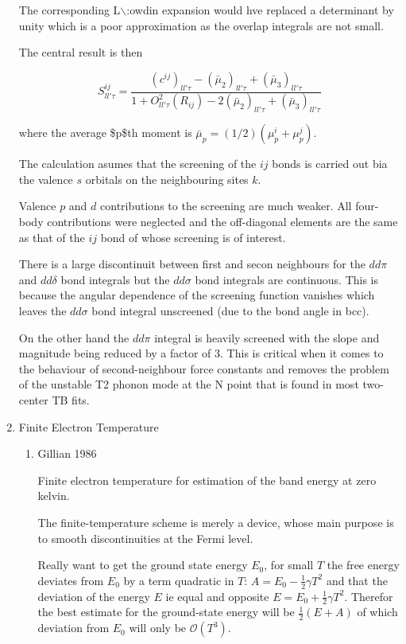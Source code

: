 \documentclass[11pt]{article}
\begin{document}
\begin{enumerate}
The corresponding L$\backslash$:owdin expansion would hve replaced a determinant by unity
which is a poor approximation as the overlap integrals are not small. 

The central result is then 

\begin{equation}
S^{ij}_{ll'\tau} = \frac{ (c^{ij})_{ll'\tau} - (\bar{\mu}_2)_{ll'\tau} +
         (\bar{\mu}_{3})_{ll'\tau} }{ 1 +  O^2_{ll'\tau}(R_{ij})  - 2(\bar{\mu}_2)_{ll'\tau} +
                               (\bar{\mu}_{3})_{ll'\tau} }
\end{equation}

where the average \$p\$th moment is
\(\bar{\mu}_p = (1/2)(\mu^i_p + \mu^j_p)\).

The calculation asumes that the screening of the \(ij\) bonds is carried out bia
the valence \(s\) orbitals on the neighbouring sites \(k\). 

Valence \(p\) and \(d\) contributions to the screening are much
weaker. All four-body contributions were neglected and the off-diagonal
elements are the same as that of the \(ij\) bond of whose screening is of
interest. 

There is a large discontinuit between first and secon neighbours for the
\(dd\pi\) and \(dd\delta\) bond integrals but the \(dd\sigma\) bond integrals are
continuous. This is because the angular dependence of the screening function
vanishes which leaves the \(dd\sigma\) bond integral unscreened (due to the bond
angle in bcc). 

On the other hand the \(dd\pi\) integral is heavily screened with
the slope and magnitude being reduced by a factor of 3. This is critical when
it comes to the behaviour of second-neighbour force constants and removes the
problem of the unstable T2 phonon mode at the N point that is found in most
two-center TB fits. 
\item Finite Electron Temperature
\label{sec:org028fe7c}
\begin{enumerate}
\item Gillian 1986
\label{sec:orgd12d7a6}
\cite{Gillan1989}

Finite electron temperature for estimation of the band energy at zero kelvin. 

The finite-temperature scheme is merely a device, whose main purpose is to
smooth discontinuities at the Fermi level.

Really want to get the ground state energy \(E_0\), for small \(T\) the free
energy deviates from \(E_0\) by a term quadratic in \(T\): \(A = E_0 -
\frac{1}{2}\gamma T^2\) and that the deviation of the energy \(E\) ie equal and
opposite \(E = E_0 + \frac{1}{2}\gamma T^2\). Therefor the best estimate for the
ground-state energy will be \(\frac{1}{2}(E + A)\) of which deviation from \(E_0\)
will only be \(\mathcal{O}(T^3)\).


\end{enumerate}
\end{enumerate}
\end{document}
